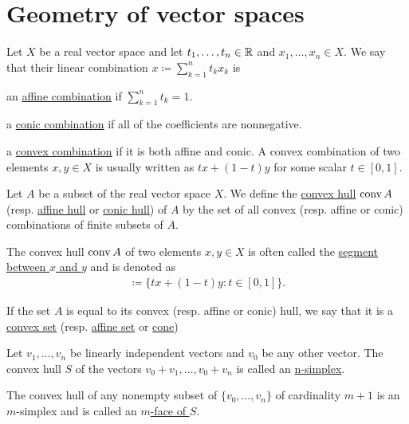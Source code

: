 \section{Geometry of vector spaces}\label{sec:geometry_of_vector_spaces}

\begin{definition}\label{def:real_linear_combinations}
  Let $X$ be a real vector space and let $t_1, \ldots, t_n \in \mathbb R$ and $x_1, \ldots, x_n \in X$. We say that their linear combination $x \coloneqq \sum_{k=1}^n t_k x_k$ is

  \begin{defenum}
    \item\label{def:real_linear_combinations/affine} an \uline{affine combination} if $\sum_{k=1}^n t_k = 1$.
    \item\label{def:real_linear_combinations/conic} a \uline{conic combination} if all of the coefficients are nonnegative.
    \item\label{def:real_linear_combinations/convex} a \uline{convex combination} if it is both affine and conic. A convex combination of two elements $x, y \in X$ is usually written as $tx + (1-t)y$ for some scalar $t \in [0, 1]$.
  \end{defenum}
\end{definition}

\begin{definition}\label{def:linear_combination_hulls}
  Let $A$ be a subset of the real vector space $X$. We define the \uline{convex hull} $\operatorname{conv} A$ (resp. \uline{affine hull} or \uline{conic hull}) of $A$ by the set of all convex (resp. affine or conic) combinations of finite subsets of $A$.

  The convex hull $\operatorname{conv} A$ of two elements $x, y \in X$ is often called the \uline{segment between $x$ and $y$} and is denoted as
  \begin{align*}
    [x, y] \coloneqq \{ tx + (1-t)y \colon t \in [0, 1] \}.
  \end{align*}

  If the set $A$ is equal to its convex (resp. affine or conic) hull, we say that it is a \uline{convex set} (resp. \uline{affine set} or \uline{cone})
\end{definition}

\begin{definition}\label{def:simplex}
  Let $v_1, \ldots, v_n$ be linearly independent vectors and $v_0$ be any other vector. The convex hull $S$ of the vectors $v_0 + v_1, \ldots, v_0 + v_n$ is called an \uline{n-simplex}.

  The convex hull of any nonempty subset of $\{ v_0, \ldots, v_n \}$ of cardinality $m + 1$ is an $m$-simplex and is called an \uline{$m$-face of $S$}.
\end{definition}
